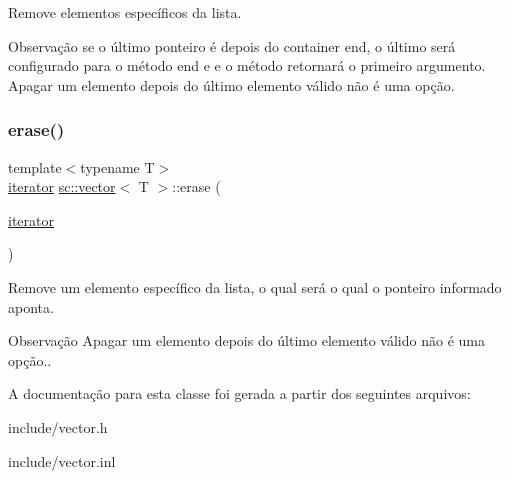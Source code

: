 Remove elementos específicos da lista.

\begin{DoxyNote}{Observação}
se o último ponteiro é depois do container end, o último será configurado para o método end e e o método retornará o primeiro argumento. Apagar um elemento depois do último elemento válido não é uma opção. 
\end{DoxyNote}
\mbox{\label{classsc_1_1vector_a1671cc04a48cfbf8b3baf2c6274aa44d}} 
\subsubsection{\texorpdfstring{erase()}{erase()}\hspace{0.1cm}{\footnotesize\ttfamily [2/2]}}
{\footnotesize\ttfamily template$<$typename T$>$ \\
\hyperlink{classsc_1_1vector_a9e5d5cc35e379aa27a93989f4a71413c}{iterator} \hyperlink{classsc_1_1vector}{sc\+::vector}$<$ T $>$\+::erase (\begin{DoxyParamCaption}\item[{\hyperlink{classsc_1_1vector_a9e5d5cc35e379aa27a93989f4a71413c}{iterator}}]{ }\end{DoxyParamCaption})}

Remove um elemento específico da lista, o qual será o qual o ponteiro informado aponta.

\begin{DoxyNote}{Observação}
Apagar um elemento depois do último elemento válido não é uma opção.. 
\end{DoxyNote}


A documentação para esta classe foi gerada a partir dos seguintes arquivos\+:\begin{DoxyCompactItemize}
\item 
include/vector.\+h\item 
include/vector.\+inl\end{DoxyCompactItemize}
